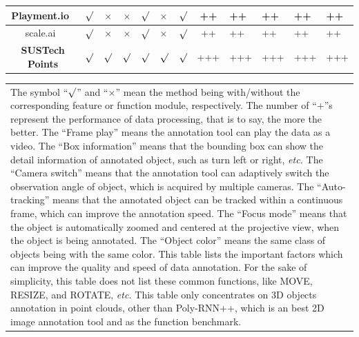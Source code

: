 \documentclass[letterpaper, 10 pt, conference]{ieeeconf}  %
\begin{document}
\begin{table}[ht]
{\begin{tabular}{c||c|c|c|p{1.5cm}<{\centering}|p{1.5cm}<{\centering}|c||c|p{2cm}<{\centering}|p{2cm}<{\centering}|p{2cm}<{\centering}|p{2cm}<{\centering}}
		Playment.io~\cite{Playment}       & $\surd$     &   $\times$ &   $\times$    &   $\surd$       &   $\times$    &  $\surd$    &     ++       &   ++     &   ++     &   ++     &   ++       \\ \hline
		
		scale.ai~\cite{scale}       & $\surd$     &   $\times$ &   $\times$    &   $\surd$       &   $\times$    &  $\surd$    &     ++       &   ++     &   ++     &   ++     &   ++       \\ \hline
		
		\textbf{SUSTech Points}            & $\surd$     &   $\surd$  &   $\surd$     &   $\surd$       &   $\surd$     &  $\surd$    &     +++      &  +++     &  +++     &  +++     &  +++       \\ \hline \hline
	\end{tabular}
	}
	\begin{tabular}{p{17.5cm}}
		The symbol ``$\surd$'' and ``$\times$'' mean the method being with/without the corresponding feature or function module, respectively. The number of ``$\textbf{+}$''s represent the performance of data processing, that is to say, the more the better. The ``Frame play'' means the annotation tool can play the data as a video. The ``Box information'' means that the bounding box can show the detail information of annotated object, such as turn left or right, \textit{etc.} The ``Camera switch''  means that the annotation tool can adaptively switch the observation angle of object, which is acquired by multiple cameras. The ``Auto-tracking'' means that the annotated object can be tracked within a continuous frame, which can improve the annotation speed. The ``Focus mode''  means that the object is automatically zoomed and centered at the projective view, when the object is being annotated. The ``Object color''  means the same class of objects being with the same color. This table lists the important factors which can improve the quality and speed of data annotation. For the sake of simplicity, this table does not list these common functions, like MOVE, RESIZE, and ROTATE, \textit{etc.} This table only concentrates on 3D objects annotation in point clouds, other than Poly-RNN++, which is an best 2D image annotation tool and as the function benchmark.
	\end{tabular}
	\label{tab:annotationMethods}
	\vspace{-0.5cm}
\end{table}
\end{document}
